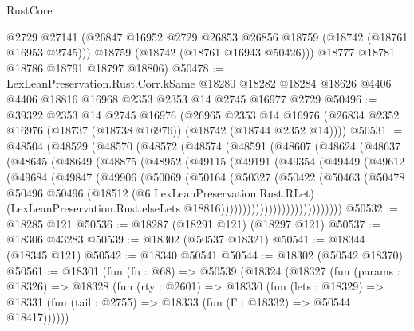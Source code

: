 \begin{lexlean}{RustCore}
\begin{coremodule}
        @2729
        @27141
        (@26847 @16952 @2729 @26853 @26856 @18759 (@18742 (@18761 @16953 @2745)))
        @18759
        (@18742 (@18761 @16943 @50426)))
      @18777
      @18781
      @18786
      @18791
      @18797
      @18806)
@50478 := LexLeanPreservation.Rust.Corr.kSame
    @18280
    @18282
    @18284
    @18626
    @4406
    @4406
    @18816
    @16968
    @2353
    @2353
    @14
    @2745
    @16977
    @2729
@50496 := @39322
    @2353
    @14
    @2745
    @16976
    (@26965
      @2353
      @14
      @16976
      (@26834 @2352 @16976 (@18737 (@18738 @16976)) (@18742 (@18744 @2352 @14))))
@50531 := @48504
    (@48529
      (@48570
        (@48572
          (@48574
            (@48591
              (@48607
                (@48624
                  (@48637
                    (@48645
                      (@48649
                        (@48875
                          (@48952
                            (@49115
                              (@49191
                                (@49354
                                  (@49449
                                    (@49612
                                      (@49684
                                        (@49847
                                          (@49906
                                            (@50069
                                              (@50164
                                                (@50327
                                                  (@50422
                                                    (@50463
                                                      (@50478
                                                        @50496
                                                        @50496
                                                        (@18512
                                                          (@6 LexLeanPreservation.Rust.RLet)
                                                          (LexLeanPreservation.Rust.elseLets
                                                            @18816))))))))))))))))))))))))))))
@50532 := @18285 @121
@50536 := @18287 (@18291 @121) (@18297 @121)
@50537 := @18306 @43283
@50539 := @18302 (@50537 @18321)
@50541 := @18344 (@18345 @121)
@50542 := @18340 @50541
@50544 := @18302 (@50542 @18370)
@50561 := @18301
    (fun (fn : @68) =>
    @50539
      (@18324
        (@18327
          (fun (params : @18326) =>
          @18328
            (fun (rty : @2601) =>
            @18330
              (fun (lets : @18329) =>
              @18331 (fun (tail : @2755) => @18333 (fun (Γ : @18332) => @50544 @18417))))))

\end{coremodule}
\end{lexlean}
